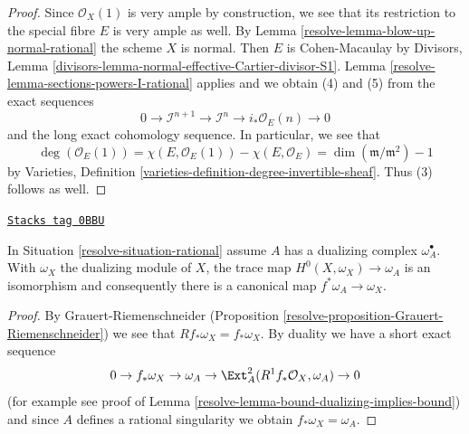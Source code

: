 \begin{proof}

Since $\mathcal{O}_X(1)$ is very ample by construction, we see that
its restriction to the special fibre $E$ is very ample as well.
By Lemma \ref{resolve-lemma-blow-up-normal-rational} the scheme $X$ is normal.
Then $E$ is Cohen-Macaulay by
Divisors, Lemma \ref{divisors-lemma-normal-effective-Cartier-divisor-S1}.
Lemma \ref{resolve-lemma-sections-powers-I-rational} applies and we obtain
(4) and (5) from the exact sequences
$$
0 \to \mathcal{I}^{n + 1} \to \mathcal{I}^n \to i_*\mathcal{O}_E(n) \to 0
$$
and the long exact cohomology sequence. In particular, we see that
$$
\deg(\mathcal{O}_E(1)) = \chi(E, \mathcal{O}_E(1)) - \chi(E, \mathcal{O}_E) =
\dim(\mathfrak m/\mathfrak m^2) - 1
$$
by Varieties, Definition \ref{varieties-definition-degree-invertible-sheaf}.
Thus (3) follows as well.
\end{proof}

\begin{lemma}
\label{resolve-lemma-dualizing-rational}
\href{https://stacks.math.columbia.edu/tag/0BBU}{\texttt{Stacks tag 0BBU}}

In Situation \ref{resolve-situation-rational} assume $A$ has a
dualizing complex $\omega_A^\bullet$. With $\omega_X$ the dualizing
module of $X$, the trace map $H^0(X, \omega_X) \to \omega_A$ is an
isomorphism and consequently there is a canonical map
$f^*\omega_A \to \omega_X$.
\end{lemma}

\begin{proof}

By Grauert-Riemenschneider
(Proposition \ref{resolve-proposition-Grauert-Riemenschneider}) we see that
$Rf_*\omega_X = f_*\omega_X$. By duality we have a short exact
sequence
$$
0 \to f_*\omega_X \to \omega_A \to
\Ext^2_A(R^1f_*\mathcal{O}_X, \omega_A) \to 0
$$
(for example see proof of Lemma \ref{resolve-lemma-bound-dualizing-implies-bound})
and since $A$ defines a rational singularity we obtain
$f_*\omega_X = \omega_A$.
\end{proof}

